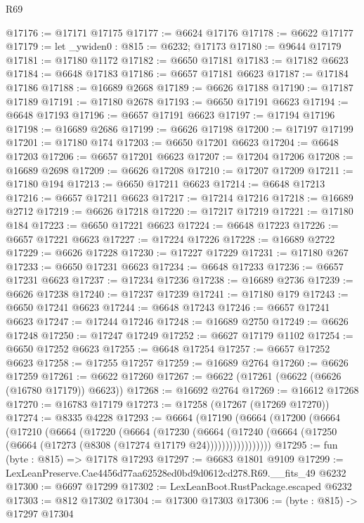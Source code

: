 \begin{lexlean}{R69}
\begin{coremodule}
{@17176 := @17171 @17175
@17177 := @6624 @17176
@17178 := @6622 @17177
@17179 := let _ywiden0 : @815 := @6232; @17173
@17180 := @9644 @17179
@17181 := @17180 @1172
@17182 := @6650 @17181
@17183 := @17182 @6623
@17184 := @6648 @17183
@17186 := @6657 @17181 @6623
@17187 := @17184 @17186
@17188 := @16689 @2668
@17189 := @6626 @17188
@17190 := @17187 @17189
@17191 := @17180 @2678
@17193 := @6650 @17191 @6623
@17194 := @6648 @17193
@17196 := @6657 @17191 @6623
@17197 := @17194 @17196
@17198 := @16689 @2686
@17199 := @6626 @17198
@17200 := @17197 @17199
@17201 := @17180 @174
@17203 := @6650 @17201 @6623
@17204 := @6648 @17203
@17206 := @6657 @17201 @6623
@17207 := @17204 @17206
@17208 := @16689 @2698
@17209 := @6626 @17208
@17210 := @17207 @17209
@17211 := @17180 @194
@17213 := @6650 @17211 @6623
@17214 := @6648 @17213
@17216 := @6657 @17211 @6623
@17217 := @17214 @17216
@17218 := @16689 @2712
@17219 := @6626 @17218
@17220 := @17217 @17219
@17221 := @17180 @184
@17223 := @6650 @17221 @6623
@17224 := @6648 @17223
@17226 := @6657 @17221 @6623
@17227 := @17224 @17226
@17228 := @16689 @2722
@17229 := @6626 @17228
@17230 := @17227 @17229
@17231 := @17180 @267
@17233 := @6650 @17231 @6623
@17234 := @6648 @17233
@17236 := @6657 @17231 @6623
@17237 := @17234 @17236
@17238 := @16689 @2736
@17239 := @6626 @17238
@17240 := @17237 @17239
@17241 := @17180 @179
@17243 := @6650 @17241 @6623
@17244 := @6648 @17243
@17246 := @6657 @17241 @6623
@17247 := @17244 @17246
@17248 := @16689 @2750
@17249 := @6626 @17248
@17250 := @17247 @17249
@17252 := @6627 @17179 @1102
@17254 := @6650 @17252 @6623
@17255 := @6648 @17254
@17257 := @6657 @17252 @6623
@17258 := @17255 @17257
@17259 := @16689 @2764
@17260 := @6626 @17259
@17261 := @6622 @17260
@17267 := @6622 (@17261 (@6622 (@6626 (@16780 @17179)) @6623))
@17268 := @16692 @2764
@17269 := @16612 @17268
@17270 := @16783 @17179
@17273 := @17258 (@17267 (@17269 @17270))
@17274 := @8335 @4228
@17293 := @6664
    (@17190
      (@6664
        (@17200
          (@6664
            (@17210
              (@6664
                (@17220
                  (@6664
                    (@17230
                      (@6664
                        (@17240
                          (@6664 (@17250 (@6664 (@17273 (@8308 (@17274 @17179 @24)))))))))))))))))
@17295 := fun (byte : @815) => @17178 @17293
@17297 := @6683 @1801 @9109
@17299 := LexLeanPreserve.Cae4456d77aa62528ed0bd9d0612cd278.R69.__fits_49 @6232
@17300 := @6697 @17299
@17302 := LexLeanBoot.RustPackage.escaped @6232
@17303 := @812 @17302
@17304 := @17300 @17303
@17306 := (byte : @815) -> @17297 @17304
}
\end{coremodule}
\end{lexlean}
